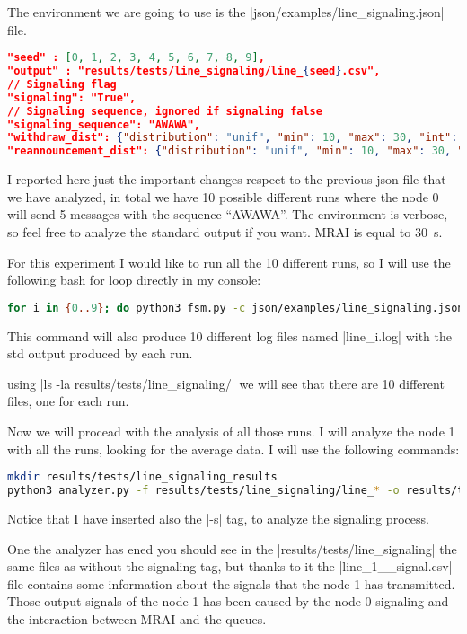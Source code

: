 \documentclass[10pt,journal,onecolumn]{IEEEtran}
\newcommand{\q}[1]{``#1''}
\begin{document}
The environment we are going to use is the |json/examples/line_signaling.json| file.
\begin{lstlisting}[language=json]
"seed" : [0, 1, 2, 3, 4, 5, 6, 7, 8, 9],
"output" : "results/tests/line_signaling/line_{seed}.csv",
// Signaling flag
"signaling": "True",
// Signaling sequence, ignored if signaling false
"signaling_sequence": "AWAWA",
"withdraw_dist": {"distribution": "unif", "min": 10, "max": 30, "int": 0.001}
"reannouncement_dist": {"distribution": "unif", "min": 10, "max": 30, "int": 0.001}
\end{lstlisting}
I reported here just the important changes respect to the previous json file
that we have analyzed, in total we have 10 possible different runs where
the node \num{0} will send \num{5} messages with the sequence \q{AWAWA}.
The environment is verbose, so feel free to analyze the standard output if you
want.
\ac{MRAI} is equal to \SI{30}{\second}.

For this experiment I would like to run all the \num{10} different runs, so I will
use the following bash for loop directly in my console:
\begin{lstlisting}[language=bash]
for i in {0..9}; do python3 fsm.py -c json/examples/line_signaling.json -r ${i} > line_${i}.log; done
\end{lstlisting}
This command will also produce 10 different log files named |line_{i}.log| with
the std output produced by each run.

using |ls -la results/tests/line_signaling/| we will see that there are
\num{10} different files, one for each run.

Now we will procead with the analysis of all those runs. I will analyze the node
\num{1} with all the runs, looking for the average data.
I will use the following commands:
\begin{lstlisting}[language=bash]
mkdir results/tests/line_signaling_results
python3 analyzer.py -f results/tests/line_signaling/line_* -o results/tests/line_signaling_results/line -n 1 -r -s
\end{lstlisting}
Notice that I have inserted also the |-s| tag, to analyze the signaling process.

One the analyzer has ened you should see in the |results/tests/line_signaling|
the same files as without the signaling tag, but thanks to it the |line_1__signal.csv|
file contains some information about the signals that the node \num{1} has transmitted.
Those output signals of the node \num{1} has been caused by the node \num{0} signaling
and the interaction between \ac{MRAI} and the queues.
\end{document}
